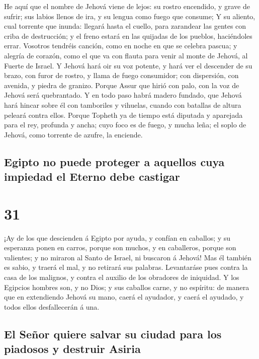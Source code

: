  He aquí que el nombre de Jehová viene de lejos: su rostro
encendido, y grave de sufrir; sus labios llenos de ira, y su lengua como
fuego que consume;  Y su aliento, cual torrente que inunda:
llegará hasta el cuello, para zarandear las gentes con criba de
destrucción; y el freno estará en las quijadas de los pueblos,
haciéndoles errar.  Vosotros tendréis canción, como en
noche en que se celebra pascua; y alegría de corazón, como el que va con
flauta para venir al monte de Jehová, al Fuerte de Israel. 
Y Jehová hará oir su voz potente, y hará ver el descender de su brazo,
con furor de rostro, y llama de fuego consumidor; con dispersión, con
avenida, y piedra de granizo.  Porque Assur que hirió con
palo, con la voz de Jehová será quebrantado.  Y en todo
paso habrá madero fundado, que Jehová hará hincar sobre él con
tamboriles y vihuelas, cuando con batallas de altura peleará contra
ellos.  Porque Topheth ya de tiempo está diputada y
aparejada para el rey, profunda y ancha; cuyo foco es de fuego, y mucha
leña; el soplo de Jehová, como torrente de azufre, la enciende.

\hypertarget{egipto-no-puede-proteger-a-aquellos-cuya-impiedad-el-eterno-debe-castigar}{%
\subsection{Egipto no puede proteger a aquellos cuya impiedad el Eterno
debe
castigar}\label{egipto-no-puede-proteger-a-aquellos-cuya-impiedad-el-eterno-debe-castigar}}

\hypertarget{section-30}{%
\section{31}\label{section-30}}

 ¡Ay de los que descienden á Egipto por ayuda, y confían en
caballos; y su esperanza ponen en carros, porque son muchos, y en
caballeros, porque son valientes; y no miraron al Santo de Israel, ni
buscaron á Jehová!  Mas él también es sabio, y traerá el
mal, y no retirará sus palabras. Levantaráse pues contra la casa de los
malignos, y contra el auxilio de los obradores de iniquidad.
 Y los Egipcios hombres son, y no Dios; y sus caballos
carne, y no espíritu: de manera que en extendiendo Jehová su mano, caerá
el ayudador, y caerá el ayudado, y todos ellos desfallecerán á una.

\hypertarget{el-seuxf1or-quiere-salvar-su-ciudad-para-los-piadosos-y-destruir-asiria}{%
\subsection{El Señor quiere salvar su ciudad para los piadosos y
destruir
Asiria}\label{el-seuxf1or-quiere-salvar-su-ciudad-para-los-piadosos-y-destruir-asiria}}

